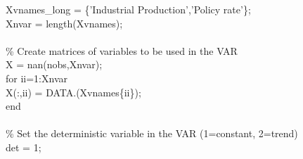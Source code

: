 \hspace{1mm}\hspace{5mm} \hspace{5mm} Xvnames\_long = \{\textcolor{matlabpurple}{'Industrial Production'},\textcolor{matlabpurple}{'Policy rate'}\}; \\ 
\hspace{1mm}\hspace{5mm} \hspace{5mm} Xnvar        = length(Xvnames); \\ 
\hspace{1mm}\hspace{5mm} \hspace{5mm}  \\ 
\hspace{1mm}\hspace{5mm} \hspace{5mm} \textcolor{matlabgreen}{\% Create matrices of variables to be used in the VAR }\\ 
\hspace{1mm}\hspace{5mm} \hspace{5mm} X = nan(nobs,Xnvar); \\ 
\hspace{1mm}\hspace{5mm} \hspace{5mm} \textcolor{matlabblue}{for} ii=1:Xnvar \\ 
\hspace{1mm}\hspace{5mm} \hspace{5mm} \hspace{5mm} X(:,ii) = DATA.(Xvnames\{ii\}); \\ 
\hspace{1mm}\hspace{5mm} \hspace{5mm} \textcolor{matlabblue}{end} \\ 
\hspace{1mm}\hspace{5mm} \hspace{5mm}  \\ 
\hspace{1mm}\hspace{5mm} \hspace{5mm} \textcolor{matlabgreen}{\% Set the deterministic variable in the VAR (1=constant, 2=trend) }\\ 
\hspace{1mm}\hspace{5mm} \hspace{5mm} det = 1; \\ 
